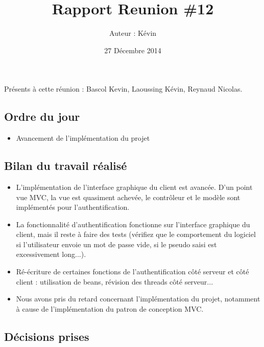 \documentclass[12pt,a4paper]{article}
\title{Rapport Reunion \#12}
\author{Auteur : Kévin \bsc{LAOUSSING}}
\date{27 Décembre 2014}
\begin{document}
\maketitle

\newpage

Présents à cette réunion : Bascol Kevin, Laoussing Kévin, Reynaud Nicolas.

\subsection*{Ordre du jour}
\begin{itemize}[label = $\blacktriangleright$]
\item Avancement de l'implémentation du projet
\end{itemize}

\subsection*{Bilan du travail réalisé}

\begin{itemize}[label = $\blacktriangleright$]
\item L'implémentation de l'interface graphique du client est avancée.
D'un point vue MVC, la vue est quasiment achevée, le contrôleur et le modèle sont implémentés pour l'authentification.

\item La fonctionnalité d'authentification fonctionne sur l'interface graphique du client, mais il reste à faire des tests (vérifiez que le comportement du logiciel si l'utilisateur envoie un mot de passe vide, si le pseudo saisi est excessivement long...).

\item Ré-écriture de certaines fonctions de l'authentification côté serveur et côté client : utilisation de beans, révision des threads côté serveur...

\item Nous avons pris du retard concernant l'implémentation du projet, notamment à cause de l'implémentation du patron de conception MVC.
\end{itemize}


\subsection*{Décisions prises}
\end{document}
